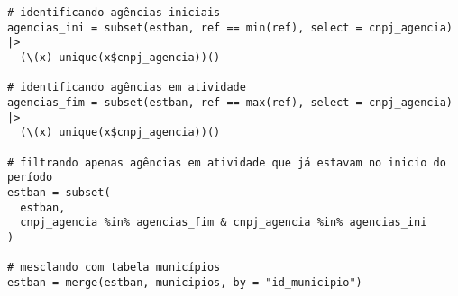 \begin{anexosenv}
\begin{lstlisting}[frame=single]
# identificando agências iniciais
agencias_ini = subset(estban, ref == min(ref), select = cnpj_agencia) |>
  (\(x) unique(x$cnpj_agencia))()

# identificando agências em atividade
agencias_fim = subset(estban, ref == max(ref), select = cnpj_agencia) |>
  (\(x) unique(x$cnpj_agencia))()

# filtrando apenas agências em atividade que já estavam no inicio do período
estban = subset(
  estban,
  cnpj_agencia %in% agencias_fim & cnpj_agencia %in% agencias_ini
)

# mesclando com tabela municípios
estban = merge(estban, municipios, by = "id_municipio")

\end{lstlisting}

\end{anexosenv}

\printindex
